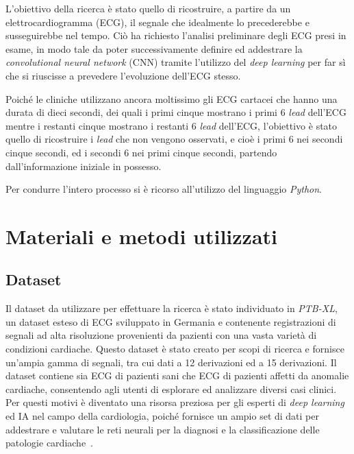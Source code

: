 \documentclass[12pt,italian]{report}
\begin{document}
	L'obiettivo della ricerca è stato quello di ricostruire, a partire da un elettrocardiogramma (ECG), il segnale che idealmente lo precederebbe e susseguirebbe nel tempo. Ciò ha richiesto l'analisi preliminare degli ECG presi in esame, in modo tale da poter successivamente definire ed addestrare la \textit{convolutional neural network} (CNN) tramite l'utilizzo del \textit{deep learning} per far sì che si riuscisse a prevedere l'evoluzione dell'ECG stesso.
	
	Poiché le cliniche utilizzano ancora moltissimo gli ECG cartacei che hanno una durata di dieci secondi, dei quali i primi cinque mostrano i primi 6 \textit{lead} dell'ECG mentre i restanti cinque mostrano i restanti 6 \textit{lead} dell'ECG, l'obiettivo è stato quello di ricostruire i \textit{lead} che non vengono osservati, e cioè i primi 6 nei secondi cinque secondi, ed i secondi 6 nei primi cinque secondi, partendo dall'informazione iniziale in possesso.
	
	Per condurre l'intero processo si è ricorso all'utilizzo del linguaggio \textit{Python}.
	
	
	\chapter{Materiali e metodi utilizzati}
	\label{chap:materiali}
	
	\section{Dataset}
	\label{sec:dataset}
	
	Il dataset da utilizzare per effettuare la ricerca è stato individuato in \textit{PTB-XL}, un dataset esteso di ECG sviluppato in Germania e contenente registrazioni di segnali ad alta risoluzione provenienti da pazienti con una vasta varietà di condizioni cardiache. Questo dataset è stato creato per scopi di ricerca e fornisce un'ampia gamma di segnali, tra cui dati a 12 derivazioni ed a 15 derivazioni. Il dataset contiene sia ECG di pazienti sani che ECG di pazienti affetti da anomalie cardiache, consentendo agli utenti di esplorare ed analizzare diversi casi clinici. Per questi motivi è diventato una risorsa preziosa per gli esperti di \textit{deep learning} ed IA nel campo della cardiologia, poiché fornisce un ampio set di dati per addestrare e valutare le reti neurali per la diagnosi e la classificazione delle patologie cardiache~\cite{datasetdistro}.
	
\end{document}
